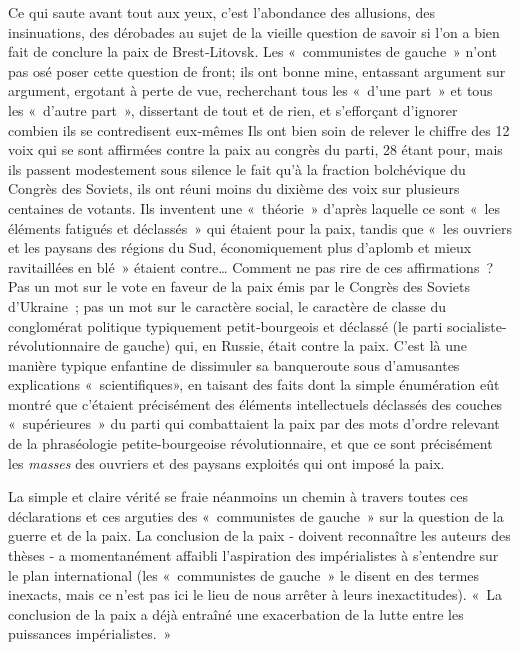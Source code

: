 \documentclass[french,twoside]{book} %
\begin{document}
Ce qui saute avant tout aux yeux, c’est l’abondance des allusions, des insinuations, des dérobades au sujet de la vieille question de savoir si l’on a bien fait de conclure la paix de Brest‑Litovsk. \hspace{1em}Les « communistes de gauche » n’ont pas osé poser cette question de front; ils ont bonne mine, entassant argument sur argument, ergotant à perte de vue, recherchant tous les « d’une part » et tous les « d’autre part », dissertant de tout et de rien, et s’efforçant d’ignorer combien ils se contredisent eux‑mêmes Ils ont bien soin de relever le chiffre des 12 voix qui se sont affirmées contre la paix au congrès du parti, 28 étant pour, mais ils passent modestement sous silence le fait qu’à la fraction bolchévique du Congrès des Soviets, ils ont réuni moins du dixième des voix sur plusieurs centaines de votants. Ils inventent une « théorie » d’après laquelle ce sont « les éléments fatigués et déclassés » qui étaient pour la paix, tandis que « les ouvriers et les paysans des régions du Sud, économiquement plus d’aplomb et mieux ravitaillées en blé » étaient contre… Comment ne pas rire de ces affirmations ? Pas un mot sur le vote en faveur de la paix émis par le Congrès des Soviets d’Ukraine ; pas un mot sur le caractère social, le caractère de classe du conglomérat politique typiquement petit‑bourgeois et déclassé (le parti socialiste-révolutionnaire de gauche) qui, en Russie, était contre la paix. C'est là une manière typique enfantine de dissimuler sa banqueroute sous d’amusantes explications « scientifiques», en taisant des faits dont la simple énumération eût montré que c’étaient précisément des éléments intellectuels déclassés des couches « supérieures » du parti qui combattaient la paix par des mots d’ordre relevant de la phraséologie petite-bourgeoise révolutionnaire, et que ce sont précisément les \emph{masses} des ouvriers et des paysans exploités qui ont imposé la paix.\par
La simple et claire vérité se fraie néanmoins un chemin à travers toutes ces déclarations et ces arguties des « communistes de gauche » sur la question de la guerre et de la paix. La conclusion de la paix ‑ doivent reconnaître les auteurs des thèses ‑ a momentanément affaibli l’aspiration des impérialistes à s’entendre sur le plan international (les « communistes de gauche » le disent en des termes inexacts, mais ce n’est pas ici le lieu de nous arrêter à leurs inexactitudes). « La conclusion de la paix a déjà entraîné une exacerbation de la lutte entre les puissances impérialistes. »\par
\end{document}

